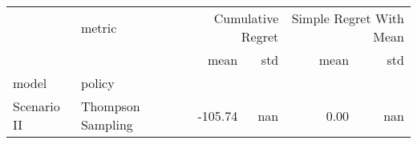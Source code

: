 \begin{tabular}{llrrrr}
 & metric & \multicolumn{2}{r}{Cumulative Regret} & \multicolumn{2}{r}{Simple Regret With Mean} \\
 &  & mean & std & mean & std \\
model & policy &  &  &  &  \\
Scenario II & Thompson Sampling & -105.74 & nan & 0.00 & nan \\
\end{tabular}
